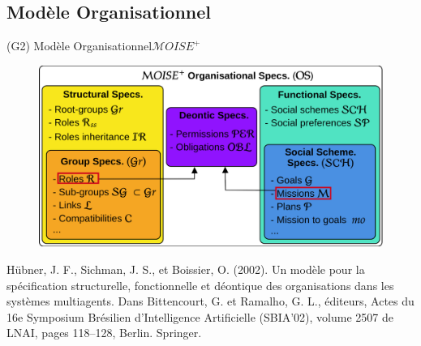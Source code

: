 \subsection{Modèle Organisationnel}

\begin{frame}{(G2) Modèle Organisationnel}{$\mathcal{M}OISE^+$}

    \begin{figure}
        \centering
        \includegraphics[width=0.75\linewidth]{figures/moise_model.png}
    \end{figure}

    \begin{spacing}{0.25}
        {\tiny Hübner, J. F., Sichman, J. S., et Boissier, O. (2002).
            Un modèle pour la spécification structurelle, fonctionnelle et déontique
            des organisations dans les systèmes multiagents.
            Dans Bittencourt, G. et Ramalho, G. L., éditeurs, Actes du 16e Symposium Brésilien d'Intelligence Artificielle (SBIA’02), volume 2507 de LNAI, pages 118–128, Berlin. Springer.}
    \end{spacing}

\end{frame}




